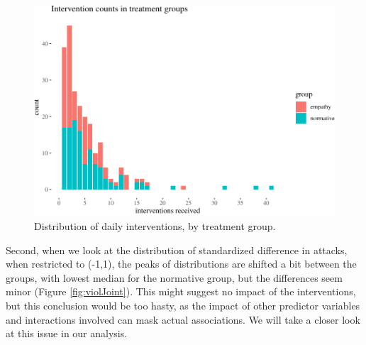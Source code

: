 \documentclass[
  10pt,
  dvipsnames, enabledeprecatedfontcommands]{scrartcl}
\begin{document}
\normalsize

\begin{figure}[H]

\begin{center}\includegraphics[width=1\linewidth]{technicalReport4_files/figure-latex/interventionsDistro-1} \end{center}
\caption{Distribution of daily interventions, by treatment group.}
\label{fig:interventionsDistro}
\end{figure}

Second, when we look at the distribution of standardized difference in
attacks, when restricted to (-1,1), the peaks of distributions are
shifted a bit between the groups, with lowest median for the normative
group, but the differences seem minor (Figure \ref{fig:violJoint}). This
might suggest no impact of the interventions, but this conclusion would
be too hasty, as the impact of other predictor variables and
interactions involved can mask actual associations. We will take a
closer look at this issue in our analysis.

\vspace{1mm}
\footnotesize
\end{document}
